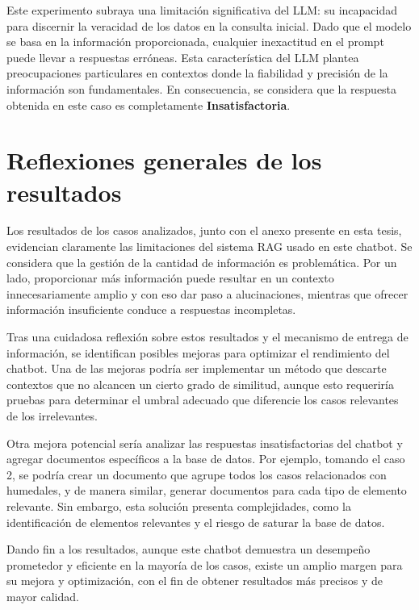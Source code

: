 Este experimento subraya una limitación significativa del LLM: su incapacidad para discernir la veracidad de los datos en la consulta inicial. 
Dado que el modelo se basa en la información proporcionada, cualquier inexactitud en el prompt puede llevar a respuestas erróneas. 
Esta característica del LLM plantea preocupaciones particulares en contextos donde la fiabilidad y precisión de la información son fundamentales. 
En consecuencia, se considera que la respuesta obtenida en este caso es completamente \textbf{Insatisfactoria}.

\newpage

\section{Reflexiones generales de los resultados}

\par Los resultados de los casos analizados, junto con el anexo presente en esta tesis, evidencian claramente las limitaciones 
del sistema RAG usado en este chatbot. Se considera que la gestión de la cantidad de información es problemática. Por un 
lado, proporcionar más información puede resultar en un contexto innecesariamente amplio y con eso dar paso a alucinaciones, 
mientras que ofrecer información insuficiente conduce a respuestas incompletas.

\par Tras una cuidadosa reflexión sobre estos resultados y el mecanismo de entrega de información, se identifican posibles 
mejoras para optimizar el rendimiento del chatbot. Una de las mejoras podría ser implementar un método que descarte 
contextos que no alcancen un cierto grado de similitud, aunque esto requeriría pruebas para determinar el umbral 
adecuado que diferencie los casos relevantes de los irrelevantes.

\par Otra mejora potencial sería analizar las respuestas insatisfactorias del chatbot y agregar documentos específicos a 
la base de datos. Por ejemplo, tomando el caso 2, se podría crear un documento que agrupe todos los casos relacionados 
con humedales, y de manera similar, generar documentos para cada tipo de elemento relevante. Sin embargo, esta 
solución presenta complejidades, como la identificación de elementos relevantes y el riesgo de saturar la base de datos.

\par Dando fin a los resultados, aunque este chatbot demuestra un desempeño prometedor y eficiente en la mayoría de los 
casos, existe un amplio margen para su mejora y optimización, con el fin de obtener resultados más precisos y de mayor calidad.

